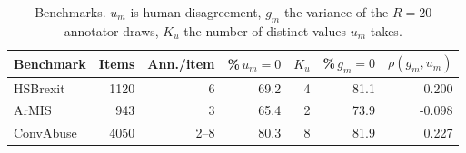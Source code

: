 \begin{table}[t]
\centering
\small
\begin{tabular}{lrrrrrr}
\hline
Benchmark & Items & Ann./item & \%\,$u_m{=}0$ & $K_u$ & \%\,$g_m{=}0$ & $\rho(g_m,u_m)$ \\
\hline
HSBrexit & 1120 & 6 & 69.2 & 4 & 81.1 & 0.200 \\
ArMIS & 943 & 3 & 65.4 & 2 & 73.9 & -0.098 \\
ConvAbuse & 4050 & 2--8 & 80.3 & 8 & 81.9 & 0.227 \\
\hline
\end{tabular}
\caption{Benchmarks. $u_m$ is human disagreement, $g_m$ the variance of the $R=20$ annotator draws, $K_u$ the number of distinct values $u_m$ takes.}
\label{tab:data}
\end{table}